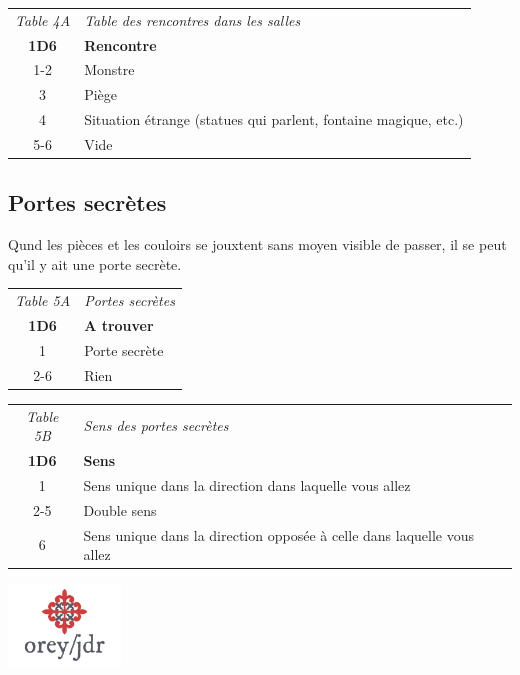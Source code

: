 \documentclass[a4paper, 11pt, twoside]{article}
\begin{document}
\begin{longtable}{cl}
\emph{Table 4A} & \emph{Table des rencontres dans les salles}\\
\textbf{1D6} & \textbf{Rencontre}\\
1-2 & Monstre\\
3 & Piège\\
4 & Situation étrange (statues qui parlent, fontaine magique, etc.)\\
5-6 & Vide\\
\end{longtable}

\subsection{Portes secrètes}
\label{sec:org1578121}

Qund les pièces et les couloirs se jouxtent sans moyen visible de passer, il se peut qu'il y ait une porte secrète.

\begin{longtable}{cl}
\emph{Table 5A} & \emph{Portes secrètes}\\
\textbf{1D6} & \textbf{A trouver}\\
1 & Porte secrète\\
2-6 & Rien\\
\end{longtable}


\begin{longtable}{cl}
\emph{Table 5B} & \emph{Sens des portes secrètes}\\
\textbf{1D6} & \textbf{Sens}\\
1 & Sens unique dans la direction dans laquelle vous allez\\
2-5 & Double sens\\
6 & Sens unique dans la direction opposée à celle dans laquelle vous allez\\
\end{longtable}


\vfill

\begin{center}
\includegraphics[width=3cm]{logo-orey-big.png}
\end{center}
\end{document}
